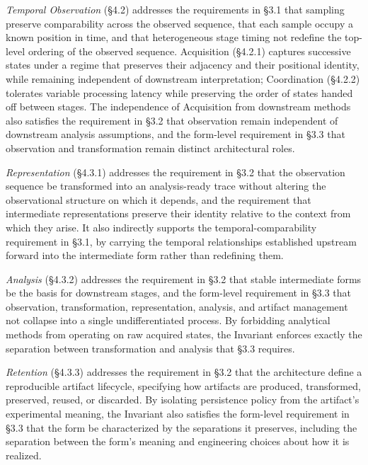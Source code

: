 \emph{Temporal Observation} (\S4.2) addresses the requirements in \S3.1 that sampling preserve comparability across the observed sequence, that each sample occupy a known position in time, and that heterogeneous stage timing not redefine the top-level ordering of the observed sequence. Acquisition (\S4.2.1) captures successive states under a regime that preserves their adjacency and their positional identity, while remaining independent of downstream interpretation; Coordination (\S4.2.2) tolerates variable processing latency while preserving the order of states handed off between stages. The independence of Acquisition from downstream methods also satisfies the requirement in \S3.2 that observation remain independent of downstream analysis assumptions, and the form-level requirement in \S3.3 that observation and transformation remain distinct architectural roles.

\emph{Representation} (\S4.3.1) addresses the requirement in \S3.2 that the observation sequence be transformed into an analysis-ready trace without altering the observational structure on which it depends, and the requirement that intermediate representations preserve their identity relative to the context from which they arise. It also indirectly supports the temporal-comparability requirement in \S3.1, by carrying the temporal relationships established upstream forward into the intermediate form rather than redefining them.

\emph{Analysis} (\S4.3.2) addresses the requirement in \S3.2 that stable intermediate forms be the basis for downstream stages, and the form-level requirement in \S3.3 that observation, transformation, representation, analysis, and artifact management not collapse into a single undifferentiated process. By forbidding analytical methods from operating on raw acquired states, the Invariant enforces exactly the separation between transformation and analysis that \S3.3 requires.

\emph{Retention} (\S4.3.3) addresses the requirement in \S3.2 that the architecture define a reproducible artifact lifecycle, specifying how artifacts are produced, transformed, preserved, reused, or discarded. By isolating persistence policy from the artifact's experimental meaning, the Invariant also satisfies the form-level requirement in \S3.3 that the form be characterized by the separations it preserves, including the separation between the form's meaning and engineering choices about how it is realized.
